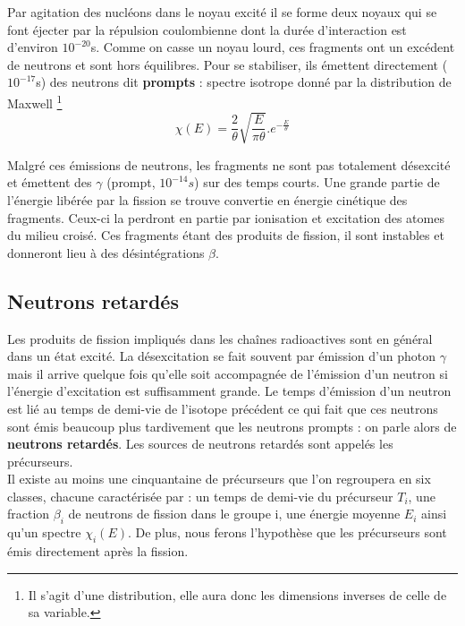 Par agitation des nucléons dans le noyau excité il se forme deux noyaux qui se font éjecter par 
la répulsion coulombienne dont la durée d'interaction est d'environ $10^{-20}$s. Comme on casse un noyau lourd, ces fragments ont un 
excédent de neutrons et sont hors équilibres. Pour se stabiliser, ils émettent directement 
($10^{-17}$s) des neutrons dit \textbf{prompts} : spectre isotrope donné par la distribution de Maxwell
\footnote{Il s'agit d'une distribution, elle aura donc les dimensions inverses de celle de sa variable.}
\begin{equation}
\chi (E) = \frac{2}{\theta }\sqrt {\frac{E}{{\pi \theta }}} .{e^{ - \frac{E}{\theta }}}
\end{equation}

Malgré ces émissions de neutrons, les fragments ne sont pas totalement désexcité et émettent 
des $\gamma$ (prompt, $10^{-14}s$) sur des temps courts.
Une grande partie de l'énergie libérée par la fission se trouve convertie en énergie cinétique
des fragments. Ceux-ci la perdront en partie par ionisation et excitation des atomes du milieu
croisé. Ces fragments étant des produits de fission, il sont instables et donneront lieu à des
désintégrations $\beta$.


\subsection{Neutrons retardés}
Les produits de fission impliqués dans les chaînes radioactives sont en général dans un
état excité. La désexcitation se fait souvent par émission d'un photon $\gamma$ mais il
arrive quelque fois qu'elle soit accompagnée de l'émission d'un neutron si l'énergie
d'excitation est suffisamment grande.
Le temps d'émission d'un neutron est lié au temps de demi-vie de l'isotope précédent
ce qui fait que ces neutrons sont émis beaucoup plus tardivement que les neutrons prompts :
on parle alors de \textbf{neutrons retardés}.
Les sources de neutrons retardés sont appelés les précurseurs.\\

Il existe au moins une cinquantaine de précurseurs que l'on regroupera en six classes, chacune
caractérisée par : un temps de demi-vie du précurseur $T_i$, une fraction $\beta_i$ de neutrons
de fission dans le groupe i, une énergie moyenne $E_i$ ainsi qu'un spectre $\chi_i(E)$.
De plus, nous ferons l'hypothèse que les précurseurs sont émis directement après la fission.

